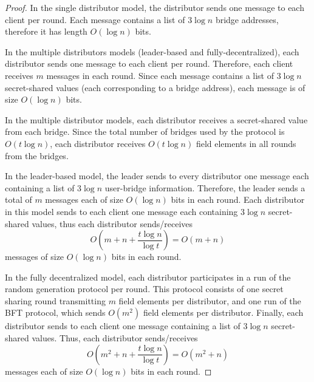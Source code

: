 \documentclass[USenglish,oneside,twocolumn]{article}
\begin{document}
\begin{proof}
	In the single distributor model, the distributor sends one message to each client per round. Each message contains a list of $3\log{n}$ bridge addresses, therefore it has length $O(\log{n})$ bits.
	
	In the multiple distributors models (leader-based and fully-decentralized), each distributor sends one message to each client per round. Therefore, each client receives $m$ messages in each round. Since each message contains a list of $3\log{n}$ secret-shared values (each corresponding to a bridge address), each message is of size $O(\log{n})$ bits.
	
	In the multiple distributor models, each distributor receives a secret-shared value from each bridge. Since the total number of bridges used by the protocol is $O(t\log{n})$, each distributor receives $O(t\log{n})$ field elements in all rounds from the bridges.	
	
	In the leader-based model, the leader sends to every distributor one message each containing a list of $3\log{n}$ user-bridge information. Therefore, the leader sends a total of $m$ messages each of size $O(\log{n})$ bits in each round. Each distributor in this model sends to each client one message each containing $3\log{n}$ secret-shared values, thus each distributor sends/receives \[O\left(m + n + \frac{t\log{n}}{\log{t}}\right) = O(m + n)\] messages of size $O(\log{n})$ bits in each round.
	
	In the fully decentralized model, each distributor participates in a run of the random generation protocol per round. This protocol consists of one secret sharing round transmitting $m$ field elements per distributor, and one run of the BFT protocol, which sends $O(m^2)$ field elements per distributor. Finally, each distributor sends to each client one message containing a list of $3\log{n}$ secret-shared values. Thus, each distributor sends/receives \[O\left(m^2 + n + \frac{t\log{n}}{\log{t}}\right) = O(m^2 + n)\] messages each of size $O(\log{n})$ bits in each round.
	
\end{proof}
\end{document}
